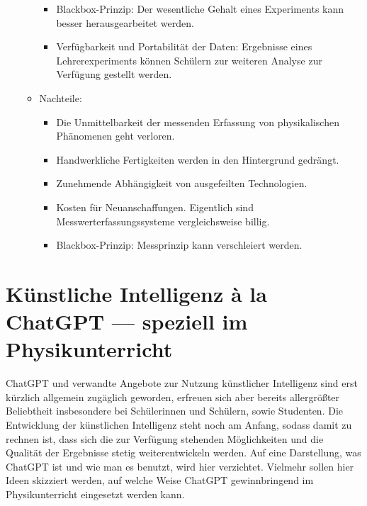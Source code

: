 \begin{itemize}
\begin{itemize}
\begin{itemize}
				\item Blackbox-Prinzip: Der wesentliche Gehalt eines Experiments kann besser herausgearbeitet werden.
				\item Verfügbarkeit und Portabilität der Daten: Ergebnisse eines Lehrerexperiments können Schülern zur weiteren Analyse zur Verfügung gestellt werden.
			\end{itemize}
		\item Nachteile:
			\begin{itemize}
				\item Die Unmittelbarkeit der messenden Erfassung von physikalischen Ph\"{a}nomenen geht verloren.
				\item Handwerkliche Fertigkeiten werden in den Hintergrund gedr\"{a}ngt.
				\item Zunehmende Abh\"{a}ngigkeit von ausgefeilten Technologien.
				\item Kosten f\"{u}r Neuanschaffungen. Eigentlich sind Messwerterfassungssysteme vergleichsweise billig.
				\item Blackbox-Prinzip: Messprinzip kann verschleiert werden.
			\end{itemize}
	\end{itemize}
\end{itemize}

\section{K\"{u}nstliche Intelligenz \`{a} la ChatGPT --- speziell im Physikunterricht}

ChatGPT und verwandte Angebote zur Nutzung k\"{u}nstlicher Intelligenz sind erst k\"{u}rzlich allgemein zug\"{a}glich geworden, erfreuen sich aber bereits allergr\"{o}{\ss}ter Beliebtheit insbesondere bei Sch\"{u}lerinnen und Sch\"{u}lern, sowie Studenten. Die Entwicklung der k\"{u}nstlichen Intelligenz steht noch am Anfang, sodass damit zu rechnen ist, dass sich die zur Verf\"{u}gung stehenden M\"{o}glichkeiten und die Qualit\"{a}t der Ergebnisse stetig weiterentwickeln werden. Auf eine Darstellung, was ChatGPT ist und wie man es benutzt, wird hier verzichtet. Vielmehr sollen hier Ideen skizziert werden, auf welche Weise ChatGPT gewinnbringend im Physikunterricht eingesetzt werden kann.

